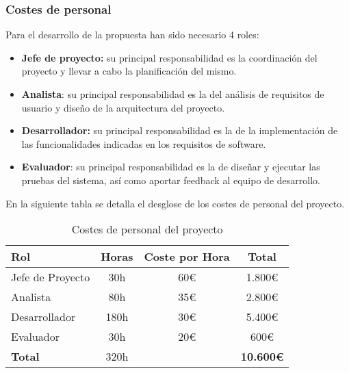 \subsubsection{Costes de personal}
Para el desarrollo de la propuesta han sido necesario 4 roles: 
\begin{itemize}
    \item \textbf{Jefe de proyecto:} su principal responsabilidad es la coordinación del proyecto y llevar a cabo la planificación del mismo.
    \item \textbf{Analista}: su principal responsabilidad es la del análisis de requisitos de usuario y diseño de la arquitectura del proyecto.
    \item \textbf{Desarrollador:} su principal responsabilidad es la de la implementación de las funcionalidades indicadas en los requisitos de software.
    \item \textbf{Evaluador}: su principal responsabilidad es la de diseñar y ejecutar las pruebas del sistema, así como aportar feedback al equipo de desarrollo.
\end{itemize}

En la siguiente tabla se detalla el desglose de los costes de personal del proyecto.


\begin{table}[htbp]
    \centering
    \caption{Costes de personal del proyecto}
    \label{tab:costes_personal}
    \begin{tabular}{@{}lccc@{}}
    \toprule
    \textbf{Rol}     & \textbf{Horas} & \textbf{Coste por Hora} & \textbf{Total}   \\ \midrule
    Jefe de Proyecto & 30h            & 60\euro                 & 1.800\euro       \\
    Analista         & 80h            & 35\euro                 & 2.800\euro       \\
    Desarrollador    & 180h           & 30\euro                 & 5.400\euro       \\
    Evaluador        & 30h            & 20\euro                 & 600\euro         \\ \midrule
    \textbf{Total}   & 320h           &                         & \textbf{10.600\euro} \\ \bottomrule
    \end{tabular}
\end{table}

